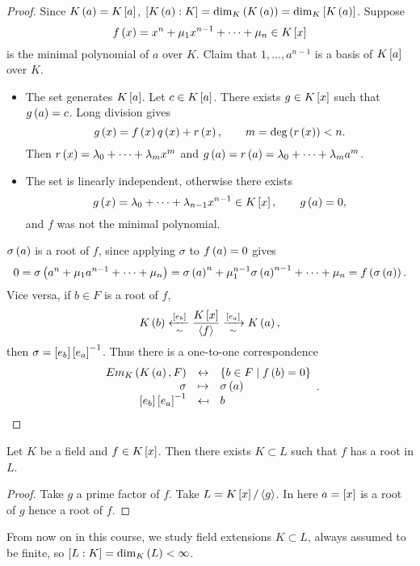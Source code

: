 \begin{proof}
Since $ K\rb{a} = K\sb{a} $, $ \sb{K\rb{a} : K} = \dim_K\rb{K\rb{a}} = \dim_K\sb{K\rb{a}} $. Suppose
$$ f\rb{x} = x^n + \mu_1x^{n - 1} + \dots + \mu_n \in K\sb{x} $$
is the minimal polynomial of $ a $ over $ K $. Claim that $ 1, \dots, a^{n - 1} $ is a basis of $ K\sb{a} $ over $ K $.
\begin{itemize}
\item The set generates $ K\sb{a} $. Let $ c \in K\sb{a} $. There exists $ g \in K\sb{x} $ such that $ g\rb{a} = c $. Long division gives
$$ g\rb{x} = f\rb{x}q\rb{x} + r\rb{x}, \qquad m = \deg\rb{r\rb{x}} < n. $$
Then $ r\rb{x} = \lambda_0 + \dots + \lambda_mx^m $ and $ g\rb{a} = r\rb{a} = \lambda_0 + \dots + \lambda_ma^m $.
\item The set is linearly independent, otherwise there exists
$$ g\rb{x} = \lambda_0 + \dots + \lambda_{n - 1}x^{n- 1} \in K\sb{x}, \qquad g\rb{a} = 0, $$
and $ f $ was not the minimal polynomial.
\end{itemize}
$ \sigma\rb{a} $ is a root of $ f $, since applying $ \sigma $ to $ f\rb{a} = 0 $ gives
$$ 0 = \sigma\rb{a^n + \mu_1a^{n - 1} + \dots + \mu_n} = \sigma\rb{a}^n + \mu_1^{n - 1}\sigma\rb{a}^{n - 1} + \dots + \mu_n = f\rb{\sigma\rb{a}}. $$
Vice versa, if $ b \in F $ is a root of $ f $,
$$ K\rb{b} \xleftarrow[\sim]{\sb{e_b}} \dfrac{K\sb{x}}{\ab{f}} \xrightarrow[\sim]{\sb{e_a}} K\rb{a}, $$
then $ \sigma = \sb{e_b}\sb{e_a}^{-1} $. Thus there is a one-to-one correspondence
$$
\begin{array}{rcl}
Em_K\rb{K\rb{a}, F} & \leftrightarrow & \cb{b \in F \mid f\rb{b} = 0} \\
\sigma & \mapsto & \sigma\rb{a} \\
\sb{e_b}\sb{e_a}^{-1} & \mapsfrom & b
\end{array}.
$$
\end{proof}

\begin{corollary}
Let $ K $ be a field and $ f \in K\sb{x} $. Then there exists $ K \subset L $ such that $ f $ has a root in $ L $.
\end{corollary}

\begin{proof}
Take $ g $ a prime factor of $ f $. Take $ L = K\sb{x} / \ab{g} $. In here $ a = \sb{x} $ is a root of $ g $ hence a root of $ f $.
\end{proof}


From now on in this course, we study field extensions $ K \subset L $, always assumed to be finite, so $ \sb{L : K} = \dim_K\rb{L} < \infty $.

